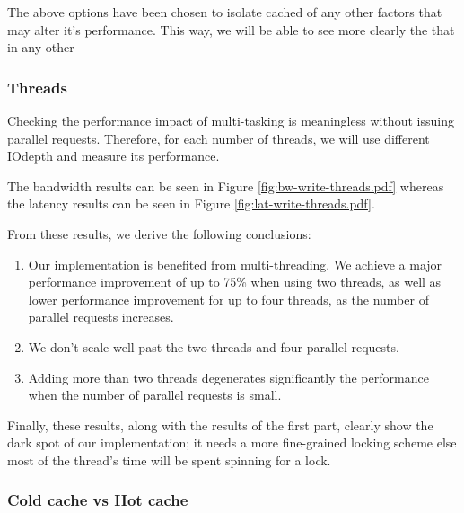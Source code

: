 The above options have been chosen to isolate cached of any other factors that 
may alter it's performance. This way, we will be able to see more clearly the   
that in any other

\subsubsection{Threads}

Checking the performance impact of multi-tasking is meaningless without issuing
parallel requests. Therefore, for each number of threads, we will use different 
IOdepth and measure its performance.

The bandwidth results can be seen in Figure \ref{fig:bw-write-threads.pdf} 
whereas the latency results can be seen in Figure 
\ref{fig:lat-write-threads.pdf}.


From these results, we derive the following conclusions:

\begin{enumerate}
	\item Our implementation is benefited from multi-threading. We achieve 
		a major performance improvement of up to 75\% when using two 
		threads, as well as lower performance improvement for up to 
		four threads, as the number of parallel requests increases.
	\item We don't scale well past the two threads and four parallel 
		requests.
	\item Adding more than two threads degenerates significantly the 
		performance when the number of parallel requests is small.
\end{enumerate}

Finally, these results, along with the results of the first part, clearly show 
the dark spot of our implementation; it needs a more fine-grained locking 
scheme else most of the thread's time will be spent spinning for a lock.

\subsubsection{Cold cache vs Hot cache}


